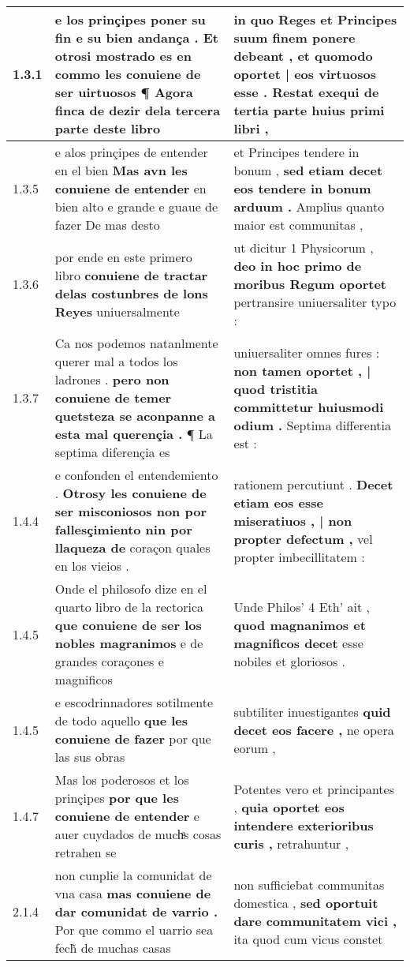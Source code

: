 \begin{tabular}{|p{1cm}|p{6.5cm}|p{6.5cm}|}
1.3.1 & e los prinçipes poner su fin e su bien andança . \textbf{ Et otrosi mostrado es en commo les conuiene de ser uirtuosos } ¶ Agora finca de dezir dela tercera parte deste libro & in quo Reges et Principes suum finem ponere debeant , \textbf{ et quomodo oportet | eos virtuosos esse . } Restat exequi de tertia parte huius primi libri , \\\hline
1.3.5 & e alos prinçipes de entender en el bien \textbf{ Mas avn les conuiene de entender } en bien alto e grande e guaue de fazer De mas desto & et Principes tendere in bonum , \textbf{ sed etiam decet eos tendere in bonum arduum . } Amplius quanto maior est communitas , \\\hline
1.3.6 & por ende en este primero libro \textbf{ conuiene de tractar delas costunbres de lons Reyes } uniuersalmente & ut dicitur 1 Physicorum , \textbf{ deo in hoc primo de moribus Regum oportet } pertransire uniuersaliter typo : \\\hline
1.3.7 & Ca nos podemos natanlmente querer mal a todos los ladrones . \textbf{ pero non conuiene de temer quetsteza se aconpanne a esta mal querençia . } ¶ La septima diferençia es & uniuersaliter omnes fures : \textbf{ non tamen oportet , | quod tristitia committetur huiusmodi odium . } Septima differentia est : \\\hline
1.4.4 & e confonden el entendemiento . \textbf{ Otrosy les conuiene de ser misconiosos non por fallesçimiento nin por llaqueza de } coraçon quales en los vieios . & rationem percutiunt . \textbf{ Decet etiam eos esse miseratiuos , | non propter defectum , } vel propter imbecillitatem : \\\hline
1.4.5 & Onde el philosofo dize en el quarto libro de la rectorica \textbf{ que conuiene de ser los nobles magranimos } e de grandes coraçones e magnificos & Unde Philos’ 4 Eth’ ait , \textbf{ quod magnanimos et magnificos decet } esse nobiles et gloriosos . \\\hline
1.4.5 & e escodrinnadores sotilmente de todo aquello \textbf{ que les conuiene de fazer } por que las sus obras & subtiliter inuestigantes \textbf{ quid decet eos facere , } ne opera eorum , \\\hline
1.4.7 & Mas los poderosos et los prinçipes \textbf{ por que les conuiene de entender } e auer cuydados de muchͣs cosas retrahen se & Potentes vero et principantes , \textbf{ quia oportet eos intendere exterioribus curis , } retrahuntur , \\\hline
2.1.4 & non cunplie la comunidat de vna casa \textbf{ mas conuiene de dar comunidat de varrio . } Por que commo el uarrio sea fech̃ de muchas casas & non sufficiebat communitas domestica , \textbf{ sed oportuit dare communitatem vici , } ita quod cum vicus constet \\\hline

\end{tabular}
